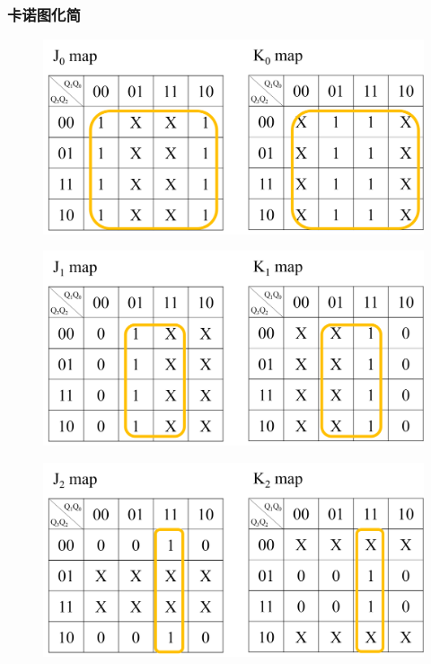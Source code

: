\documentclass{article}
\begin{document}
\subsubsection{卡诺图化简}

\begin{figure}[!hbp]
  \centering
  \includegraphics[scale=0.5]{2/k1.png}
\end{figure}

\begin{figure}[!hbp]
  \centering
  \includegraphics[scale=0.5]{2/k2.png}
\end{figure}

\newpage

\begin{figure}[!hbp]
  \centering
  \includegraphics[scale=0.5]{2/k3.png}
\end{figure}
\end{document}
